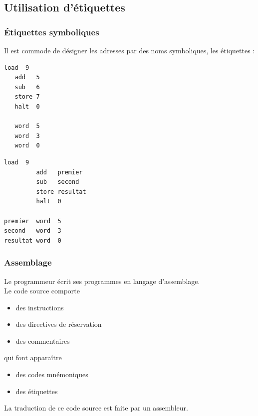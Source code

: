 \subsection{Utilisation d'étiquettes}

\begin{frame}[containsverbatim]
  \frametitle{Étiquettes symboliques}

Il est commode de désigner les adresses par des \alert{noms symboliques}, les \alert{étiquettes} :
\begin{multicols}{2}

\begin{lstlisting}[frame=single]
   load  9
   add   5
   sub   6
   store 7
   halt  0

   word  5
   word  3
   word  0
\end{lstlisting}
\break
\begin{lstlisting}[frame=single]
         load  9
         add   premier
         sub   second
         store resultat
         halt  0

premier  word  5
second   word  3
resultat word  0
\end{lstlisting}
\end{multicols}

\end{frame}

\begin{frame}
  \frametitle{Assemblage}

Le programmeur écrit ses programmes en \alert{langage d'assemblage}.\\
 Le code source comporte
\begin{itemize}
\item des instructions
\item des directives de réservation
\item des commentaires
\end{itemize}
qui font apparaître
\begin{itemize}
\item des codes mnémoniques
\item des étiquettes
\end{itemize}
La traduction de ce code source est faite par un \alert{assembleur}.
\end{frame}



